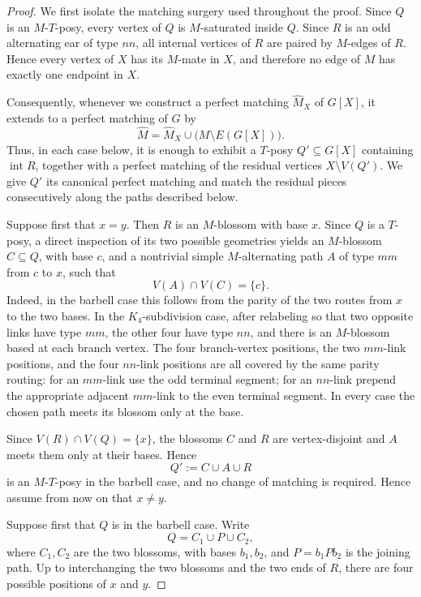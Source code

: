 \documentclass[preprint,12pt]{elsarticle}
\theoremstyle{plain}
\begin{document}
\begin{proof}
We first isolate the matching surgery used throughout the proof.
Since \(Q\) is an \(M\)-\(T\)-posy, every vertex of \(Q\) is
\(M\)-saturated inside \(Q\). Since \(R\) is an odd alternating ear of
type \(nn\), all internal vertices of \(R\) are paired by \(M\)-edges
of \(R\). Hence every vertex of \(X\) has its \(M\)-mate in \(X\), and
therefore no edge of \(M\) has exactly one endpoint in \(X\).

Consequently, whenever we construct a perfect matching
\(\widehat M_X\) of \(G[X]\), it extends to a perfect matching of \(G\)
by
\[
\widehat M
=
\widehat M_X
\cup
\bigl(M\setminus E(G[X])\bigr).
\]
Thus, in each case below, it is enough to exhibit a \(T\)-posy
\(Q'\subseteq G[X]\) containing \(\operatorname{int}R\), together with
a perfect matching of the residual vertices \(X\setminus V(Q')\).
We give \(Q'\) its canonical perfect matching and match the residual
pieces consecutively along the paths described below.

Suppose first that \(x=y\). Then \(R\) is an \(M\)-blossom with base
\(x\). Since \(Q\) is a \(T\)-posy, a direct inspection of its two
possible geometries yields an \(M\)-blossom \(C\subseteq Q\), with base
\(c\), and a nontrivial simple \(M\)-alternating path \(A\) of type
\(mm\) from \(c\) to \(x\), such that
\[
V(A)\cap V(C)=\{c\}.
\]
Indeed, in the barbell case this follows from the parity of the two
routes from \(x\) to the two bases. In the \(K_4\)-subdivision case,
after relabeling so that two opposite links have type \(mm\), the other
four have type \(nn\), and there is an \(M\)-blossom based at each
branch vertex. The four branch-vertex positions, the two \(mm\)-link
positions, and the four \(nn\)-link positions are all covered by the
same parity routing: for an \(mm\)-link use the odd terminal segment;
for an \(nn\)-link prepend the appropriate adjacent \(mm\)-link to the
even terminal segment. In every case the chosen path meets its blossom
only at the base.

Since \(V(R)\cap V(Q)=\{x\}\), the blossoms \(C\) and \(R\) are
vertex-disjoint and \(A\) meets them only at their bases. Hence
\[
Q':=C\cup A\cup R
\]
is an \(M\)-\(T\)-posy in the barbell case, and no change of matching
is required. Hence assume from now on that \(x\neq y\).

Suppose first that \(Q\) is in the barbell case. Write
\[
Q=C_1\cup P\cup C_2,
\]
where \(C_1,C_2\) are the two blossoms, with bases \(b_1,b_2\), and
\(P=b_1Pb_2\) is the joining path. Up to interchanging the two blossoms
and the two ends of \(R\), there are four possible positions of
\(x\) and \(y\).


\end{proof}
\end{document}
